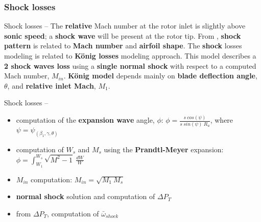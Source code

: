 \subsubsection{Shock losses}
	\begin{frame}{Shock losses -- }
		The \textbf{relative} Mach number at the rotor inlet is slightly above \textbf{sonic speed}; a \textbf{shock wave} will be present at the rotor tip. From \cite{manfredi2020transonic}, \textbf{shock pattern} is related to \textbf{Mach number} and \textbf{airfoil shape}.
		\newline
		\newline 
		The \textbf{shock} losses modeling is related to \textbf{K\"onig losses} modeling approach. This model describes a \textbf{2 shock waves loss} using a \textbf{single normal shock} with respect to a computed Mach number, $M_{in}$. 
		\newline
		\newline
		\textbf{K\"onig model} \cite[Sec. 6.7]{axial2004} depends mainly on \textbf{blade deflection angle}, $\theta$, and \textbf{relative inlet Mach}, $M_1$.
	\end{frame}
	
	\begin{frame}{Shock losses -- }
		\begin{itemize}
			\item computation of the \textbf{expansion wave} angle, $\phi$: $\phi = \frac{s \ cos(\psi)}{s \ sin(\psi) \ R_u}$, where $\psi = \psi_{(\beta_1, \gamma, \theta)}$
			\item computation of $W_s$ and $M_s$ using the \textbf{Prandtl-Meyer} expansion: $\phi = \int_{W_1}^{W_s} \sqrt{M^2 - 1} \ \frac{dW}{W}$
			\item $M_{in}$ computation: $M_{in} = \sqrt{M_1 \ M_s}$
			\item \textbf{normal shock} solution and computation of $\Delta P_T$
			\item from $\Delta P_T$, computation of $\bar{\omega}_{shock}$
		\end{itemize}
	\end{frame}

